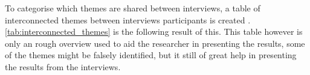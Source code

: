 To categorise which themes are shared between interviews, a table of interconnected themes between interviews participants is created \cite{bjo_2022}. \autoref{tab:interconnected_themes} is the following result of this. This table however is only an rough overview used to aid the researcher in presenting the results, some of the themes might be falsely identified, but it still of great help in presenting the results from the interviews.

\begin{table}[H]
\end{table}
